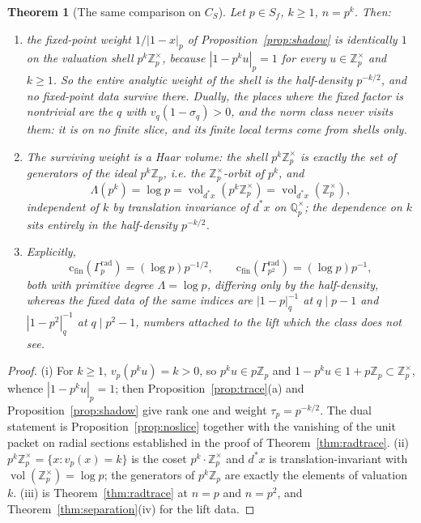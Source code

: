 \documentclass[11pt]{amsart}
\newtheorem{theorem}{Theorem}[section]
\theoremstyle{definition}
\theoremstyle{remark}
\newcommand{\Z}{\mathbb Z}
\newcommand{\Q}{\mathbb Q}
\newcommand{\vol}{\operatorname{vol}}
\newcommand{\cfin}{\mathrm{c}_{\mathrm{fin}}}
\begin{document}
\begin{theorem}[The same comparison on $C_S$]\label{thm:carrierside}
Let $p\in S_f$, $k\ge1$, $n=p^k$. Then:
\begin{enumerate}
\item[(i)] the fixed-point weight $1/|1-x|_p$ of
Proposition~\ref{prop:shadow} is identically $1$ on the valuation shell
$p^k\Z_p^\times$, because $|1-p^ku|_p=1$ for every $u\in\Z_p^\times$ and
$k\ge1$. So the entire analytic weight of the shell is the half-density
$p^{-k/2}$, and no fixed-point data survive there. Dually, the places where the
fixed factor is nontrivial are the $q$ with $v_q(1-\sigma_q)>0$, and the norm
class never visits them: it is on no finite slice, and its finite local terms
come from shells only.
\item[(ii)] The surviving weight is a Haar volume: the shell $p^k\Z_p^\times$
is exactly the set of generators of the ideal $p^k\Z_p$, i.e. the
$\Z_p^\times$-orbit of $p^k$, and
\[
  \Lambda(p^k)=\log p=\vol_{d^*x}(p^k\Z_p^\times)=\vol_{d^*x}(\Z_p^\times),
\]
independent of $k$ by translation invariance of $d^*x$ on $\Q_p^\times$; the
dependence on $k$ sits entirely in the half-density $p^{-k/2}$.
\item[(iii)] Explicitly,
\[
  \cfin(\Gamma_p^{\mathrm{rad}})=(\log p)p^{-1/2},\qquad
  \cfin(\Gamma_{p^2}^{\mathrm{rad}})=(\log p)p^{-1},
\]
both with primitive degree $\Lambda=\log p$, differing only by the
half-density, whereas the fixed data of the same indices are $|1-p|_q^{-1}$ at
$q\mid p-1$ and $|1-p^2|_q^{-1}$ at $q\mid p^2-1$, numbers attached to the lift
which the class does not see.
\end{enumerate}
\end{theorem}

\begin{proof}
(i) For $k\ge1$, $v_p(p^ku)=k>0$, so $p^ku\in p\Z_p$ and
$1-p^ku\in1+p\Z_p\subset\Z_p^\times$, whence $|1-p^ku|_p=1$; then
Proposition~\ref{prop:trace}(a) and Proposition~\ref{prop:shadow} give rank one
and weight $\tau_p=p^{-k/2}$. The dual statement is
Proposition~\ref{prop:noslice} together with the vanishing of the unit packet
on radial sections established in the proof of Theorem~\ref{thm:radtrace}.
(ii) $p^k\Z_p^\times=\{x:v_p(x)=k\}$ is the coset $p^k\cdot\Z_p^\times$ and
$d^*x$ is translation-invariant with $\vol(\Z_p^\times)=\log p$; the generators
of $p^k\Z_p$ are exactly the elements of valuation $k$. (iii) is
Theorem~\ref{thm:radtrace} at $n=p$ and $n=p^2$, and
Theorem~\ref{thm:separation}(iv) for the lift data.
\end{proof}
\end{document}
